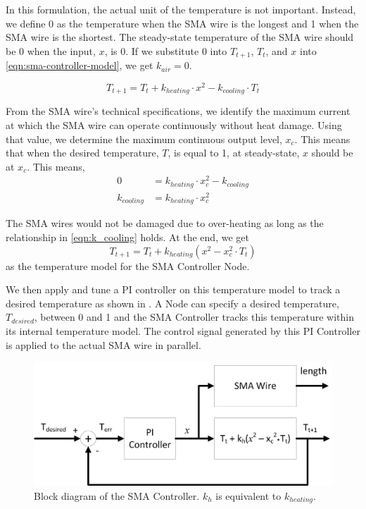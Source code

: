 In this formulation, the actual unit of the temperature is not important. Instead, we define 0 as the temperature when the SMA wire is the longest and 1 when the SMA wire is the shortest. The steady-state temperature of the SMA wire should be 0 when the input, $x$, is 0. If we substitute 0 into $T_{t+1}$, $T_{t}$, and $x$ into \eqref{eqn:sma-controller-model}, we get $k_{air} = 0$. 

\begin{equation}\label{eqn:sma-controller-model-1}
T_{t+1} =  T_{t} + k_{heating} \cdot x^2 - k_{cooling} \cdot T_{t}
\end{equation}

From the SMA wire's technical specifications\cite{FlexinolTechSpecs}, we identify the maximum current at which the SMA wire can operate continuously without heat damage. Using that value, we determine the maximum continuous output level, $x_c$. This means that when the desired temperature, $T$, is equal to 1, at steady-state, $x$ should be at $x_c$. This means, 
\begin{subequations}
	\begin{flalign}
	0 &= k_{heating} \cdot x_c^2 - k_{cooling} \\
	k_{cooling} &=  k_{heating} \cdot x_c^2\label{eqn:k_cooling}
	\end{flalign}
\end{subequations}

The SMA wires would not be damaged due to over-heating as long as the relationship in \eqref{eqn:k_cooling} holds. At the end, we get
\begin{equation}\label{eqn:sma-controller-model-2}
T_{t+1} =  T_{t} + k_{heating}(x^2 -  x_c^2 \cdot T_{t})
\end{equation}
as the temperature model for the SMA Controller Node.

We then apply and tune a PI controller on this temperature model to track a desired temperature as shown in . A Node can specify a desired temperature, $T_{desired}$, between 0 and 1 and the SMA Controller tracks this temperature within its internal temperature model. The control signal generated by this PI Controller is applied to the actual SMA wire in parallel. 

\begin{figure} [htb]
	\centering
	\includegraphics[width=1.0\textwidth]{"fig/validations/SMA Controller"}
	\caption[Block diagram of the SMA Controller]{Block diagram of the SMA Controller. $k_h$ is equivalent to $k_{heating}$.}
	\label{fig:SMA Controller}
\end{figure}


